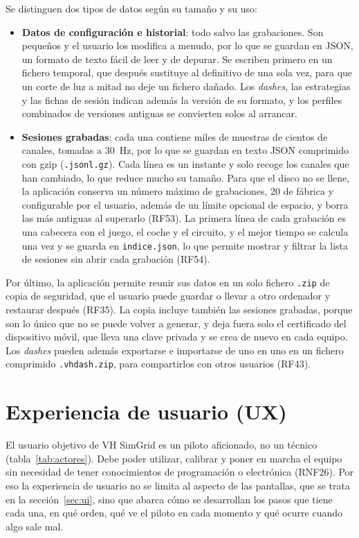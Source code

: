 Se distinguen dos tipos de datos según su tamaño y su uso:

\begin{itemize}
	\item \textbf{Datos de configuración e historial}: todo salvo las grabaciones. Son pequeños y el usuario los modifica a menudo, por lo que se guardan en JSON, un formato de texto fácil de leer y de depurar. Se escriben primero en un fichero temporal, que después sustituye al definitivo de una sola vez, para que un corte de luz a mitad no deje un fichero dañado. Los \textit{dashes}, las estrategias y las fichas de sesión indican además la versión de su formato, y los perfiles combinados de versiones antiguas se convierten solos al arrancar.
	\item \textbf{Sesiones grabadas}: cada una contiene miles de muestras de cientos de canales, tomadas a 30~Hz, por lo que se guardan en texto JSON comprimido con gzip (\texttt{.jsonl.gz}). Cada línea es un instante y solo recoge los canales que han cambiado, lo que reduce mucho su tamaño. Para que el disco no se llene, la aplicación conserva un número máximo de grabaciones, 20 de fábrica y configurable por el usuario, además de un límite opcional de espacio, y borra las más antiguas al superarlo (RF53). La primera línea de cada grabación es una cabecera con el juego, el coche y el circuito, y el mejor tiempo se calcula una vez y se guarda en \texttt{indice.json}, lo que permite mostrar y filtrar la lista de sesiones sin abrir cada grabación (RF54).
\end{itemize}

Por último, la aplicación permite reunir sus datos en un solo fichero \texttt{.zip} de copia de seguridad, que el usuario puede guardar o llevar a otro ordenador y restaurar después (RF35). La copia incluye también las sesiones grabadas, porque son lo único que no se puede volver a generar, y deja fuera solo el certificado del dispositivo móvil, que lleva una clave privada y se crea de nuevo en cada equipo. Los \textit{dashes} pueden además exportarse e importarse de uno en uno en un fichero comprimido \texttt{.vhdash.zip}, para compartirlos con otros usuarios (RF43).

\section{Experiencia de usuario (UX)}
\label{sec:ux}
El usuario objetivo de VH SimGrid es un piloto aficionado, no un técnico (tabla~\ref{tab:actores}). Debe poder utilizar, calibrar y poner en marcha el equipo sin necesidad de tener conocimientos de programación o electrónica (RNF26). Por eso la experiencia de usuario no se limita al aspecto de las pantallas, que se trata en la sección~\ref{sec:ui}, sino que abarca cómo se desarrollan los pasos que tiene cada una, en qué orden, qué ve el piloto en cada momento y qué ocurre cuando algo sale mal.


